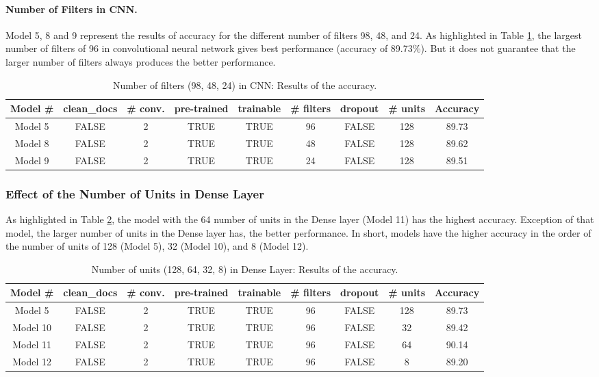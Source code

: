 \documentclass[11pt]{article}
\begin{document}
\paragraph*{Number of Filters in CNN.}
Model 5, 8 and 9 represent the results of accuracy for the different number of filters 98, 48, and 24.
%
As highlighted in Table \ref{table:acc_numfiltersCNN}, 
the largest number of filters of 96 in convolutional neural network gives best performance (accuracy of 89.73\%). But it does not guarantee that the larger number of filters always produces the better performance.
\begin{table}[h]
\centering
\begin{tabular}{||c|c|c|c|c|c|c|c|c||}
\hline
Model \# & clean\_docs &	\# conv.	& pre-trained &	trainable &	\# filters	& dropout &	\# units & Accuracy\\
\hline
Model 5	&	FALSE	&	2	&	TRUE	&	TRUE	&	\cellcolor{blue!25}96	&	FALSE	&	128	&	\cellcolor{blue!25}89.73\\
\hline
Model	8	&	FALSE	&	2	&	TRUE	&	TRUE	&	\cellcolor{yellow!25}48	&	FALSE	&	128	&	89.62	\\
\hline
Model	9	&	FALSE	&	2	&	TRUE	&	TRUE	&	\cellcolor{yellow!25}24	&	FALSE	&	128	&	89.51	\\
\hline
\end{tabular}
\caption{Number of filters (98, 48, 24) in CNN: Results of the accuracy.}
\label{table:acc_numfiltersCNN}
\end{table}


\subsubsection{Effect of the Number of Units in Dense Layer}

As highlighted in Table \ref{table:acc_numUnitsDense}, the model with the 64 number of units in the Dense layer (Model 11) has the highest accuracy. Exception of that model, the larger number of units in the Dense layer has, the better performance.
%
In short, models have the higher accuracy in the order of the number of units of 128 (Model 5), 32 (Model 10), and 8 (Model 12).
\begin{table}[h]
\centering
\begin{tabular}{||c|c|c|c|c|c|c|c|c||}
\hline
Model \# & clean\_docs &	\# conv.	& pre-trained &	trainable &	\# filters	& dropout &	\# units & Accuracy\\
\hline
Model 5	&	FALSE	& 2	&	TRUE	&	TRUE	&	96	&	FALSE	&	\cellcolor{yellow!25}128	&	89.73\\
\hline
Model	10	&	FALSE	&	2	&	TRUE	&	TRUE	&	96	&	FALSE	&	\cellcolor{yellow!25}32	&	89.42	\\
\hline
Model	11	&	FALSE	&	2	&	TRUE	&	TRUE	&	96	&	FALSE	&	\cellcolor{blue!25}64	&	\cellcolor{blue!25}90.14	\\
\hline
Model	12	&	FALSE	&	2	&	TRUE	&	TRUE	&	96	&	FALSE	&	\cellcolor{yellow!25}8	&	89.20	\\
\hline
\end{tabular}
\caption{Number of units (128, 64, 32, 8) in Dense Layer: Results of the accuracy.}
\label{table:acc_numUnitsDense}
\end{table}
\end{document}
